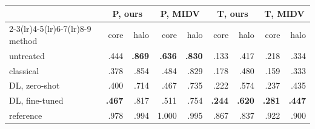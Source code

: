 \begin{tabular}{lrrrrrrrr}
\toprule
 & \multicolumn{2}{c}{P, ours} & \multicolumn{2}{c}{P, MIDV} & \multicolumn{2}{c}{T, ours} & \multicolumn{2}{c}{T, MIDV} \\
\cmidrule(lr){2-3}\cmidrule(lr){4-5}\cmidrule(lr){6-7}\cmidrule(lr){8-9}
method & core & halo & core & halo & core & halo & core & halo \\
\midrule
untreated & .444 & \textbf{.869} & \textbf{.636} & \textbf{.830} & .133 & .417 & .218 & .334 \\
classical & .378 & .854 & .484 & .829 & .178 & .480 & .159 & .333 \\
DL, zero-shot & .400 & .714 & .467 & .735 & .222 & .574 & .237 & .435 \\
DL, fine-tuned & \textbf{.467} & .817 & .511 & .754 & \textbf{.244} & \textbf{.620} & \textbf{.281} & \textbf{.447} \\
\midrule
reference & .978 & .994 & 1.000 & .995 & .867 & .837 & .922 & .900 \\
\bottomrule
\end{tabular}
